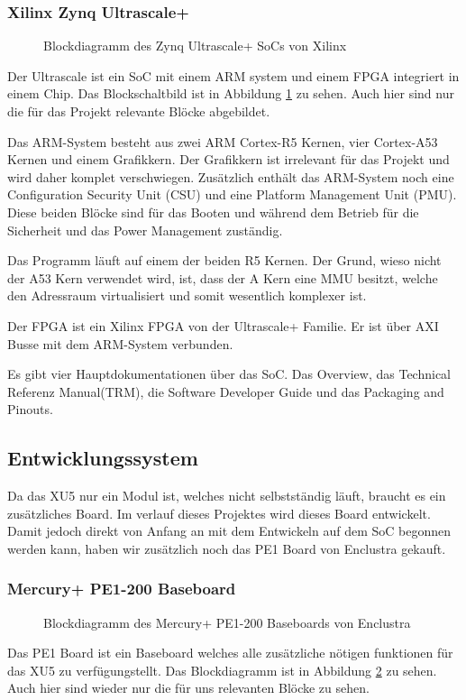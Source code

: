 \documentclass{article}
\begin{document}
\subsubsection*{Xilinx Zynq Ultrascale+}
\begin{figure}[tb]
    \caption{Blockdiagramm des Zynq Ultrascale+ SoCs von Xilinx}
    \label{fig:bd_soc}
\end{figure}

Der Ultrascale ist ein SoC mit einem ARM system und einem FPGA integriert in einem Chip. Das Blockschaltbild ist in Abbildung \ref{fig:bd_soc} zu sehen. Auch hier sind nur die für das Projekt relevante Blöcke abgebildet. 

Das ARM-System besteht aus zwei ARM Cortex-R5 Kernen, vier Cortex-A53 Kernen und einem Grafikkern. Der Grafikkern ist irrelevant für das Projekt und wird daher komplet verschwiegen. Zusätzlich enthält das ARM-System noch eine Configuration Security Unit (CSU) und eine Platform Management Unit (PMU). Diese beiden Blöcke sind für das Booten und während dem Betrieb für die Sicherheit und das Power Management zuständig.

Das Programm läuft auf einem der beiden R5 Kernen. Der Grund, wieso nicht der A53 Kern verwendet wird, ist, dass der A Kern eine MMU besitzt, welche den Adressraum virtualisiert und somit wesentlich komplexer ist.

Der FPGA ist ein Xilinx FPGA von der Ultrascale+ Familie. Er ist über AXI Busse mit dem ARM-System verbunden.

Es gibt vier Hauptdokumentationen über das SoC. Das Overview, das Technical Referenz Manual(TRM), die Software Developer Guide und das Packaging and Pinouts.


\subsection{Entwicklungssystem}
Da das XU5 nur ein Modul ist, welches nicht selbstständig läuft, braucht es ein zusätzliches Board. Im verlauf dieses Projektes wird dieses Board entwickelt. Damit jedoch direkt von Anfang an mit dem Entwickeln auf dem SoC begonnen werden kann, haben wir zusätzlich noch das PE1 Board von Enclustra gekauft. 

\subsubsection*{Mercury+ PE1-200 Baseboard}
\begin{figure}[tb]
    \caption{Blockdiagramm des Mercury+ PE1-200 Baseboards von Enclustra}
    \label{fig:bd_pe1}
\end{figure}
Das PE1 Board ist ein Baseboard welches alle zusätzliche nötigen funktionen für das XU5 zu verfügungstellt.
Das Blockdiagramm ist in Abbildung \ref{fig:bd_pe1} zu sehen. Auch hier sind wieder nur die für uns relevanten Blöcke zu sehen.
\end{document}
